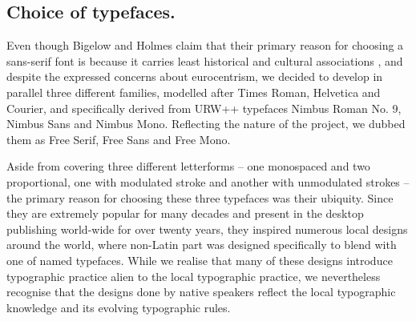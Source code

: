 \documentclass[english]{eurotex2003}
\begin{document}
\subsection{Choice of typefaces.} Even though Bigelow and Holmes claim
that their primary reason for choosing a sans-serif font is because it
carries least historical and cultural associations
\cite[p. 1003]{Bigelow:1993}, and despite the expressed concerns about
eurocentrism, we decided to develop in parallel three different
families, modelled after Times Roman, Helvetica and Courier, and
specifically derived from URW++ typefaces Nimbus Roman No. 9, Nimbus
Sans and Nimbus Mono. Reflecting the nature of the project, we dubbed
them as Free Serif, Free Sans and Free Mono.

Aside from covering three different letterforms -- one monospaced and
two proportional, one with modulated stroke and another with
unmodulated strokes -- the primary reason for choosing these three
typefaces was their ubiquity. Since they are extremely popular for
many decades and present in the desktop publishing world-wide for over
twenty years, they inspired numerous local designs around the world,
where non-Latin part was designed specifically to blend with one of
named typefaces. While we realise that many of these designs introduce
typographic practice alien to the local typographic practice, we
nevertheless recognise that the designs done by native speakers
reflect the local typographic knowledge and its evolving typographic
rules.
\end{document}
